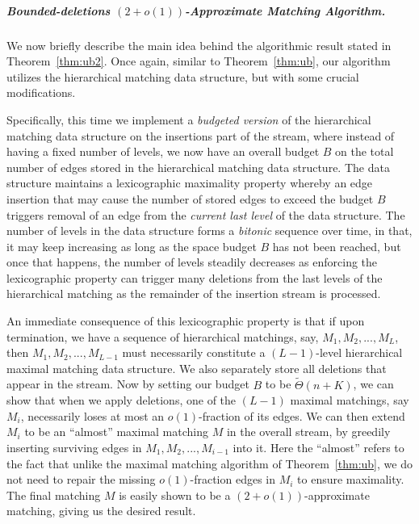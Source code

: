 \documentclass[11pt,a4paper]{article}
\begin{document}
\subparagraph{Bounded-deletions $(2+o(1))$-Approximate Matching Algorithm.}
We now briefly describe the main idea behind the algorithmic result stated in Theorem~\ref{thm:ub2}. Once again, similar to Theorem~\ref{thm:ub}, our algorithm utilizes the hierarchical matching data structure, but with some crucial modifications.

Specifically, this time we implement a {\em budgeted version} of the hierarchical matching data structure on the insertions part of the stream, where instead of having a fixed number of levels, we now have an overall budget $B$ on the total number of edges stored in the hierarchical matching data structure. The data structure maintains a lexicographic maximality property whereby an edge insertion that may cause the number of stored edges to exceed the budget $B$ triggers removal of an edge from the {\em current last level} of the data structure. The number of levels in the data structure forms a {\em bitonic} sequence over time, in that, it may keep increasing as long as the space budget $B$ has not been reached, but once that happens, the number of levels steadily decreases as enforcing the lexicographic property can trigger many 
deletions from the last levels of the hierarchical matching as the remainder of the insertion stream is processed.
 
An immediate consequence of this lexicographic property is that if upon termination, we have a sequence of hierarchical matchings, say, $M_1, M_2, ..., M_{L}$, then $M_1, M_2, ..., M_{L-1}$ must necessarily constitute a $(L-1)$-level hierarchical maximal matching data structure. We also separately store all deletions that appear in the stream. Now by setting our budget $B$ to be $\tilde{\Theta}(n+K)$, we can show that when we apply deletions, one of the $(L-1)$ maximal matchings, say $M_i$, necessarily loses at most an $o(1)$-fraction of its edges. We can then extend $M_i$ to be an ``almost'' maximal matching $M$ in the overall stream, by greedily inserting surviving edges in $M_1, M_2, ..., M_{i-1}$ into it. Here the ``almost'' refers to the fact that unlike the maximal matching algorithm of Theorem~\ref{thm:ub}, we do not need to repair the missing $o(1)$-fraction edges in $M_i$ to ensure maximality. The final matching $M$ is easily shown to be a $(2+o(1))$-approximate matching, giving us the desired result.
\end{document}
